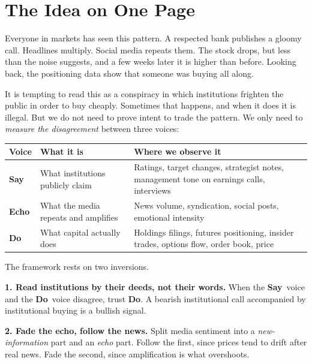 \documentclass[11pt,a4paper]{article}
\theoremstyle{plain}
\theoremstyle{definition}
\newcommand{\SAY}{\textcolor{say}{\textbf{Say}}}
\newcommand{\ECHO}{\textcolor{echo}{\textbf{Echo}}}
\newcommand{\DO}{\textcolor{do}{\textbf{Do}}}
\begin{document}
\section{The Idea on One Page}\label{sec:onepage}

Everyone in markets has seen this pattern. A respected bank publishes a gloomy call. Headlines multiply. Social media repeats them. The stock drops, but less than the noise suggests, and a few weeks later it is higher than before. Looking back, the positioning data show that someone was buying all along.

It is tempting to read this as a conspiracy in which institutions frighten the public in order to buy cheaply. Sometimes that happens, and when it does it is illegal. But we do not need to prove intent to trade the pattern. We only need to \emph{measure the disagreement} between three voices:

\begin{center}
\begin{tabular}{@{}>{\raggedright}p{2.0cm}>{\raggedright}p{5.0cm}>{\raggedright\arraybackslash}p{6.2cm}@{}}
\toprule
Voice & What it is & Where we observe it \\
\midrule
\SAY & What institutions publicly claim & Ratings, target changes, strategist notes, management tone on earnings calls, interviews \\
\ECHO & What the media repeats and amplifies & News volume, syndication, social posts, emotional intensity \\
\DO & What capital actually does & Holdings filings, futures positioning, insider trades, options flow, order book, price \\
\bottomrule
\end{tabular}
\end{center}

The framework rests on two inversions.

\begin{keyidea}
\textbf{1. Read institutions by their deeds, not their words.} When the \SAY\ voice and the \DO\ voice disagree, trust \DO. A bearish institutional call accompanied by institutional buying is a bullish signal.

\textbf{2. Fade the echo, follow the news.} Split media sentiment into a \emph{new-information} part and an \emph{echo} part. Follow the first, since prices tend to drift after real news. Fade the second, since amplification is what overshoots.
\end{keyidea}
\end{document}
